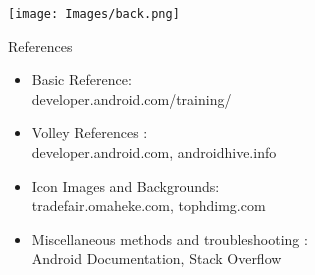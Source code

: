 \documentclass{beamer}
\begin{document}
{\usebackgroundtemplate%
{\texttt{[image: Images/back.png]}}

\begin{frame}{References}
    
    \begin{itemize}
        \item {Basic Reference:\\developer.android.com/training/}
        \item {Volley References :\\ developer.android.com, androidhive.info}
        \item {Icon Images and Backgrounds:\\ tradefair.omaheke.com, tophdimg.com }
        \item {Miscellaneous methods and troubleshooting :\\ Android Documentation, Stack Overflow}
    \end{itemize}
    
\end{frame}
}
\end{document}
